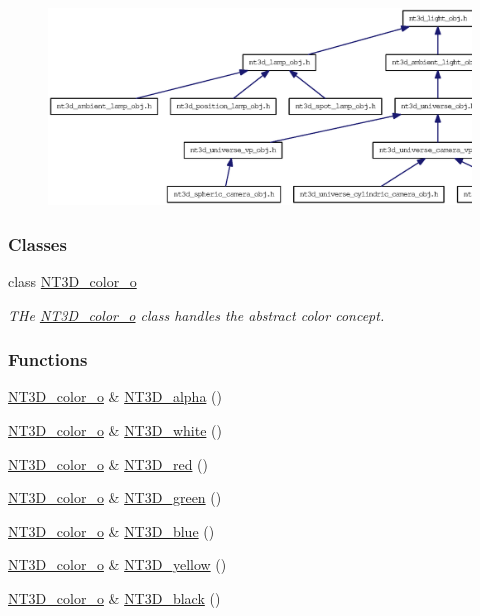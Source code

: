 \begin{figure}[H]
\begin{center}
\leavevmode
\includegraphics[width=400pt]{nt3d__color__obj_8h__dep__incl}
\end{center}
\end{figure}
\subsubsection*{Classes}
\begin{DoxyCompactItemize}
\item 
class \hyperlink{class_n_t3_d__color__o}{NT3D\_\-color\_\-o}
\begin{DoxyCompactList}\small\item\em THe \hyperlink{class_n_t3_d__color__o}{NT3D\_\-color\_\-o} class handles the abstract color concept. \item\end{DoxyCompactList}\end{DoxyCompactItemize}
\subsubsection*{Functions}
\begin{DoxyCompactItemize}
\item 
\hyperlink{class_n_t3_d__color__o}{NT3D\_\-color\_\-o} \& \hyperlink{nt3d__color__obj_8h_a0b0b65c804a47161d989658b0d8d6146}{NT3D\_\-alpha} ()
\item 
\hyperlink{class_n_t3_d__color__o}{NT3D\_\-color\_\-o} \& \hyperlink{nt3d__color__obj_8h_a27f712d0714828c09588ce067c8d7aa7}{NT3D\_\-white} ()
\item 
\hyperlink{class_n_t3_d__color__o}{NT3D\_\-color\_\-o} \& \hyperlink{nt3d__color__obj_8h_a20cf83e1d18bd97449e5199cbfa1ebc8}{NT3D\_\-red} ()
\item 
\hyperlink{class_n_t3_d__color__o}{NT3D\_\-color\_\-o} \& \hyperlink{nt3d__color__obj_8h_a19d5d0f3dadd9d9c64f2a5467cb80819}{NT3D\_\-green} ()
\item 
\hyperlink{class_n_t3_d__color__o}{NT3D\_\-color\_\-o} \& \hyperlink{nt3d__color__obj_8h_a96887f2f2c63bc9dc86958e64a023a5b}{NT3D\_\-blue} ()
\item 
\hyperlink{class_n_t3_d__color__o}{NT3D\_\-color\_\-o} \& \hyperlink{nt3d__color__obj_8h_a3429f4e6464c6e9b66937de96b247b66}{NT3D\_\-yellow} ()
\item 
\hyperlink{class_n_t3_d__color__o}{NT3D\_\-color\_\-o} \& \hyperlink{nt3d__color__obj_8h_ad51c9a79d4f394392022e7633c13d4b1}{NT3D\_\-black} ()
\end{DoxyCompactItemize}


